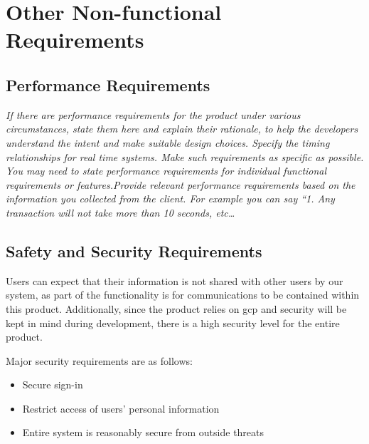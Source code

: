 
\section{Other Non-functional Requirements}\label{sec:non-functional-requirements}
    \subsection{Performance Requirements}\label{sec:performance-requirements}
        \emph{If there are performance requirements for the product under various circumstances, state them here and explain their rationale, to help the developers understand the intent and make suitable design choices. Specify the timing relationships for real time systems. Make such requirements as specific as possible. You may need to state performance requirements for individual functional requirements or features.\gnl Provide relevant performance requirements based on the information you collected from the client. For example you can say “1. Any transaction will not take more than 10 seconds, etc\dots}
    \subsection{Safety and Security Requirements}\label{sec:safety-security}
        Users can expect that their information is not shared with other users by our system, as part of the functionality is for communications to be contained within this product. Additionally, since the product relies on \gls{gcp} and security will be kept in mind during development, there is a high security level for the entire product.
        \par Major security requirements are as follows:
        \begin{itemize}
            \item Secure sign-in
            \item Restrict access of users' personal information
            \item Entire system is reasonably secure from outside threats
        \end{itemize}
